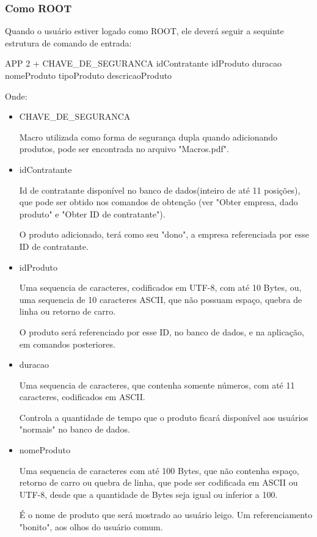 \documentclass{article}
\begin{document}
			\subsubsection{Como ROOT}\indent
				\par Quando o usuário estiver logado como ROOT, ele deverá seguir a sequinte estrutura de comando de entrada:
				\begin{center}
					APP 2 + CHAVE\_DE\_SEGURANCA idContratante idProduto duracao nomeProduto tipoProduto descricaoProduto
				\end{center}
				\par Onde:
				\begin{itemize}
					\item{CHAVE\_DE\_SEGURANCA}
						\par Macro utilizada como forma de segurança dupla quando adicionando produtos, pode ser encontrada no arquivo "Macros.pdf".
					\item{idContratante}
						\par Id de contratante disponível no banco de dados(inteiro de até 11 posições), que pode ser obtido nos comandos de obtenção (ver "Obter empresa, dado produto" e "Obter ID de contratante").
						\par O produto adicionado, terá como seu "dono", a empresa referenciada por esse ID de contratante.
					\item{idProduto}
						\par Uma sequencia de caracteres, codificados em UTF-8, com até 10 Bytes, ou, uma sequencia de 10 caracteres ASCII, que não possuam espaço, quebra de linha ou retorno de carro.
						\par O produto será referenciado por esse ID, no banco de dados, e na aplicação, em comandos posteriores.
					\item{duracao}
						\par Uma sequencia de caracteres, que contenha somente números, com até 11 caracteres, codificados em ASCII.
						\par Controla a quantidade de tempo que o produto ficará disponível aos usuários "normais" no banco de dados.
					\item{nomeProduto}
						\par Uma sequencia de caracteres com até 100 Bytes, que não contenha espaço, retorno de carro ou quebra de linha, que pode ser codificada em ASCII ou UTF-8, desde que a quantidade de Bytes seja igual ou inferior a 100.
						\par É o nome de produto que será mostrado ao usuário leigo. Um referenciamento "bonito", aos olhos do usuário comum.

\end{itemize}
\end{document}
